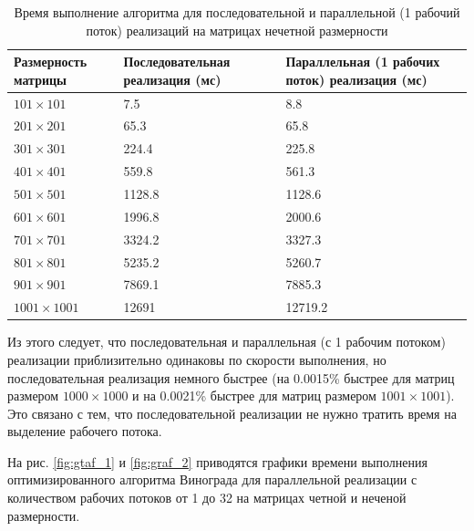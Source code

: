 \documentclass[a4paper,12pt]{article}
\begin{document}
    	 \begin{table} [h!]
    	\begin{center}
    	\caption{Время выполнение алгоритма для последовательной и параллельной (1 рабочий поток) реализаций на матрицах нечетной размерности}
    	\begin{tabular}{|p{5cm}|p{5cm}|p{5cm}|}
    	\hline 
    	Размерность матрицы & Последовательная реализация (мс) & Параллельная (1 рабочих поток) реализация (мс) \\ 
    	\hline 
    	$101 \times 101$ & 7.5 & 8.8 \\ 
    	\hline 
    	$201 \times 201$ & 65.3 & 65.8  \\ 
    	\hline 
    	$301 \times 301$ & 224.4 & 225.8 \\ 
    	\hline 
    	$401 \times 401$ & 559.8 & 561.3 \\ 
    	\hline 
    	$501 \times 501$ & 1128.8 & 1128.6 \\ 
    	\hline 
    	$601 \times 601$ & 1996.8 & 2000.6  \\ 
    	\hline 
    	$701 \times 701$ & 3324.2 & 3327.3  \\ 
    	\hline 
    	$801 \times 801$ & 5235.2 & 5260.7 \\ 
    	\hline 
    	$901 \times 901$ & 7869.1 & 7885.3 \\ 
    	\hline 
    	$1001 \times 1001$ & 12691 & 12719.2 \\ 
    	\hline 
    	\end{tabular} 
    	\label{table:table02}
    	\end{center}
    	\end{table}
    	
    	Из этого следует, что последовательная и параллельная (с 1 рабочим потоком) реализации приблизительно одинаковы по скорости выполнения, но последовательная реализация немного быстрее (на 0.0015\% быстрее для матриц размером $1000 \times 1000$ и на 0.0021\% быстрее для матриц размером $1001 \times 1001$). Это связано с тем, что последовательной реализации не нужно тратить время на выделение рабочего потока.
    	
        На рис. \ref{fig:gtaf_1} и \ref{fig:graf_2} приводятся графики времени выполнения оптимизированного алгоритма Винограда для параллельной реализации с количеством рабочих потоков от 1 до 32 на матрицах четной и неченой размерности.
        
\end{document}
